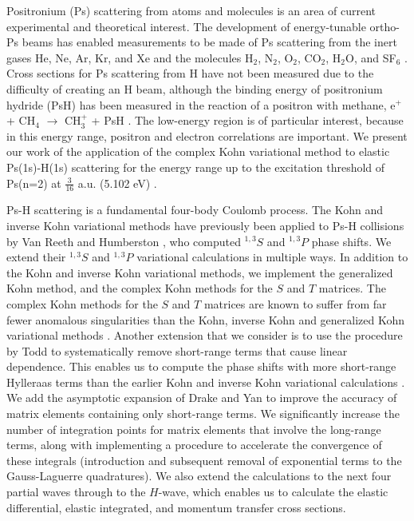 \documentclass[preprint,showpacs,showkeys,preprintnumbers,amsmath,amssymb,longbibliography,pra,aps]{revtex4-1}
\begin{document}
Positronium (Ps) scattering from atoms and molecules is an area of current 
experimental and theoretical interest. The development of energy-tunable
ortho-Ps beams
\cite{Brown1985,Laricchia1987,Zafar1996,Garner1996,Laricchia2008} 
has enabled measurements to be made of Ps scattering from the inert gases He,
Ne, Ar, Kr, and Xe
\cite{Garner1996,Garner2000,Armitage2002,Laricchia2004,Armitage2006,Laricchia2008,Engbrecht2008,Brawley2010a}
and the molecules H$_2$, N$_2$, O$_2$, CO$_2$, H$_2$O, and SF$_6$
\cite{Garner1996,Garner1998,Garner2000,Laricchia2004,Armitage2006,Beale2006,Brawley2010a}.
Cross sections for Ps scattering from H have not been measured due to the
difficulty of creating an H beam, although the binding energy of positronium
hydride (PsH) has been measured in the reaction of a positron with methane,
e$^+$ + CH$_4$ $\to$ CH$_3^+$ + PsH \cite{Schrader1992}. The low-energy region
is of particular interest, because in this energy range, positron and electron 
correlations are important. We present
our work of the application of the complex Kohn variational 
method to elastic Ps(1s)-H(1s) scattering for the energy range
up to the excitation threshold of Ps(n=2) at $\tfrac{3}{16}$ a.u.
(5.102 eV) \cite{Conferences1,Conferences2,Conferences3,WoodsDiss2015}.

Ps-H scattering is a fundamental four-body Coulomb process. The Kohn and 
inverse Kohn variational methods have previously been applied to Ps-H 
collisions by Van Reeth and Humberston \cite{VanReeth2003,VanReeth2004}, who 
computed $^{1,3}S$ and $^{1,3}P$ phase shifts. We 
extend their $^{1,3}S$ and $^{1,3}P$  variational calculations in 
multiple ways. In addition to
the Kohn and inverse Kohn variational methods, we implement the 
generalized Kohn method, and the complex Kohn methods for the $S$ and $T$ matrices.
The complex Kohn methods for the $S$ and $T$ matrices
are known to suffer from far fewer anomalous singularities than the Kohn,
inverse Kohn and generalized Kohn variational methods
\cite{Lucchese1989, Cooper2009, Cooper2010}. Another extension that we
consider is to use the procedure by Todd 
\cite{Todd2007} to systematically remove short-range terms that cause linear 
dependence. This enables us to compute the phase shifts
with more short-range Hylleraas terms than the earlier 
Kohn and inverse Kohn variational calculations
\cite{VanReeth2003, VanReeth2004}.
We add the asymptotic expansion of Drake and Yan
\cite{Drake1995, Yan1997} to improve the accuracy of matrix elements
containing only short-range terms. We significantly increase
the number of integration points for matrix
elements that involve the long-range terms, along with implementing a
procedure to
accelerate the convergence of these integrals (introduction
and subsequent removal of exponential terms to the Gauss-Laguerre
quadratures). We also extend the 
calculations to the next four partial waves through to the $H$-wave, which
enables us to calculate the elastic differential, elastic integrated,
and momentum transfer cross sections.
\end{document}
